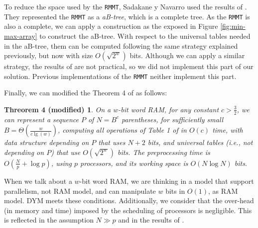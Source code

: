To reduce the space used by the {\tt RMMT}, Sadakane y Navarro used the results of \cite{Patrascu:2008:SUC:1470582.1470670}. They represented the {\tt RMMT} as a \emph{aB-tree}, which is a complete tree. As the {\tt RMMT} is also a complete, we can apply a construction as the exposed in Figure \ref{fig:min-max-array} to construct the aB-tree. With respect to the universal tables needed in the aB-tree, them can be computed following the same strategy explained previously, but now with size $O(\sqrt{2^{w}})$ bits. Although we can apply a similar strategy, the results of \cite{Patrascu:2008:SUC:1470582.1470670} are not practical, so we did not implement this part of our solution. Previous implementations of the {\tt RMMT} neither implement this part.

Finally, we can modified the Theorem 4 of \cite{Navarro:2014:FFS:2620785.2601073} as follows:
			
\newtheorem{theorem}{Threorem 4 (modified)}
\begin{theorem}
	On a $w$-bit word RAM, for any constant $c>\frac{3}{2}$, we can represent a sequence $P$ of $N=B^{c}$ parentheses, for sufficiently small $B=\Theta(\frac{w}{c\lg(w)})$, computing all operations of Table 1 of \cite{Navarro:2014:FFS:2620785.2601073} in $O(c)$ time, with data structure depending on $P$ that uses $N+2$ bits, and universal tables (i.e., not depending on $P$) that use $O(\sqrt{2^{w}})$ bits. The preprocessing time is $O(\frac{N}{p} + \log p)$, using $p$ processors, and its working space is $O(N\log N)$ bits.
\end{theorem}
				
	When we talk about a $w$-bit word RAM, we are thinking in a model that support parallelism, not RAM model, and can manipulate $w$ bits in $O(1)$, as RAM model. DYM meets these conditions. Additionally, we consider that the over-head (in memory and time) imposed by the scheduling of processors is negligible. This is reflected in the assumption $ N\gg p$ and in the results of \cite{Blumofe:1999:SMC:324133.324234}.
